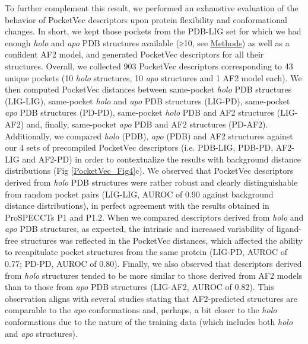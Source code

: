 To further complement this result, we performed an exhaustive evaluation of the behavior of PocketVec descriptors upon protein flexibility and conformational changes. In short, we kept those pockets from the PDB-LIG set for which we had enough \textit{holo} and \textit{apo} PDB structures available (≥10, see \hyperref[PocketVec_Methods]{Methods}) as well as a confident AF2 model, and generated PocketVec descriptors for all their structures. Overall, we collected 903 PocketVec descriptors corresponding to 43 unique pockets (10 \textit{holo} structures, 10 \textit{apo} structures and 1 AF2 model each). We then computed PocketVec distances between same-pocket \textit{holo} PDB structures (LIG-LIG), same-pocket \textit{holo} and \textit{apo} PDB structures (LIG-PD), same-pocket \textit{apo} PDB structures (PD-PD), same-pocket \textit{holo} PDB and AF2 structures (LIG-AF2) and, finally, same-pocket \textit{apo} PDB and AF2 structures (PD-AF2). Additionally, we compared \textit{holo} (PDB), \textit{apo} (PDB) and AF2 structures against our 4 sets of precompiled PocketVec descriptors (i.e. PDB-LIG, PDB-PD, AF2-LIG and AF2-PD) in order to contextualize the results with background distance distributions (Fig \ref{PocketVec_Fig4}c). We observed that PocketVec descriptors derived from \textit{holo} PDB structures were rather robust and clearly distinguishable from random pocket pairs (LIG-LIG, AUROC of 0.90 against background distance distributions), in perfect agreement with the results obtained in ProSPECCTs P1 and P1.2. When we compared descriptors derived from \textit{holo} and \textit{apo} PDB structures, as expected, the intrinsic and increased variability of ligand-free structures was reflected in the PocketVec distances, which affected the ability to recapitulate pocket structures from the same protein (LIG-PD, AUROC of 0.77; PD-PD, AUROC of 0.80). Finally, we also observed that descriptors derived from \textit{holo} structures tended to be more similar to those derived from AF2 models than to those from \textit{apo} PDB structures (LIG-AF2, AUROC of 0.82). This observation aligns with several studies stating that AF2-predicted structures are comparable to the \textit{apo} conformations and, perhaps, a bit closer to the \textit{holo} conformations due to the nature of the training data (which includes both \textit{holo} and \textit{apo} structures)\cite{zhang_benchmarking_2023}.


